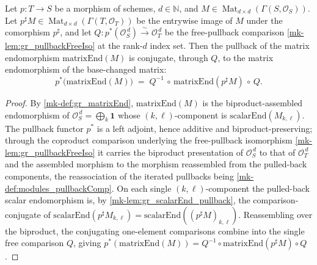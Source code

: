 \begin{lemma}\label{mk-lem:gr_matrixEnd_pullback}
  \leanok

  Let \(p : T \to S\) be a morphism of schemes, \(d \in \mathbb{N}\), and
  \(M \in \operatorname{Mat}_{d\times d}(\Gamma(S, \mathcal{O}_S))\). Let
  \(p^{\sharp}M \in \operatorname{Mat}_{d\times d}(\Gamma(T, \mathcal{O}_T))\) be the entrywise
  image of \(M\) under the comorphism \(p^{\sharp}\), and let
  \(Q : p^{*}(\mathcal{O}_S^{\,d}) \xrightarrow{\sim} \mathcal{O}_T^{\,d}\) be the free-pullback
  comparison \ref{mk-lem:gr_pullbackFreeIso} at the rank-\(d\) index set. Then the
  pullback of the matrix endomorphism \(\mathrm{matrixEnd}(M)\) is conjugate, through \(Q\), to
  the matrix endomorphism of the base-changed matrix:
  \[
    p^{*}\bigl(\mathrm{matrixEnd}(M)\bigr)
      \;=\; Q^{-1} \,\circ\, \mathrm{matrixEnd}(p^{\sharp}M) \,\circ\, Q .
  \]
\end{lemma}
\begin{proof}
  By \ref{mk-def:gr_matrixEnd}, \(\mathrm{matrixEnd}(M)\) is the biproduct-assembled endomorphism
  of \(\mathcal{O}_S^{\,d} = \bigoplus_{k} \mathbf 1\) whose \((k,\ell)\)-component is
  \(\mathrm{scalarEnd}(M_{k,\ell})\). The pullback functor \(p^{*}\) is a left adjoint, hence
  additive and biproduct-preserving; through the coproduct comparison underlying the
  free-pullback isomorphism \ref{mk-lem:gr_pullbackFreeIso} it carries the biproduct presentation
  of \(\mathcal{O}_S^{\,d}\) to that of \(\mathcal{O}_T^{\,d}\) and the assembled morphism to the
  morphism reassembled from the pulled-back components, the reassociation of the iterated
  pullbacks being \ref{mk-def:modules_pullbackComp}. On each single \((k,\ell)\)-component the
  pulled-back scalar endomorphism is, by \ref{mk-lem:gr_scalarEnd_pullback}, the
  comparison-conjugate of \(\mathrm{scalarEnd}(p^{\sharp}M_{k,\ell}) =
  \mathrm{scalarEnd}((p^{\sharp}M)_{k,\ell})\). Reassembling over the biproduct, the conjugating
  one-element comparisons combine into the single free comparison \(Q\), giving
  \(p^{*}(\mathrm{matrixEnd}(M)) = Q^{-1}\circ\mathrm{matrixEnd}(p^{\sharp}M)\circ Q\).
\end{proof}

